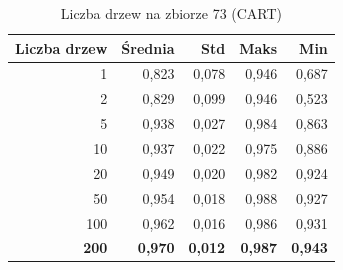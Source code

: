 \begin{table}[htbp]
\centering
\small
\setlength{\tabcolsep}{6pt}
\renewcommand{\arraystretch}{1.2}
\caption{Liczba drzew na zbiorze 73 (CART)}
\label{tab:CART_tree_count_73}
\begin{tabular}{r|r|r|r|r}
\toprule
Liczba drzew & Średnia & Std & Maks & Min \\
\hline
1 & 0,823 & 0,078 & 0,946 & 0,687 \\
2 & 0,829 & 0,099 & 0,946 & 0,523 \\
5 & 0,938 & 0,027 & 0,984 & 0,863 \\
10 & 0,937 & 0,022 & 0,975 & 0,886 \\
20 & 0,949 & 0,020 & 0,982 & 0,924 \\
50 & 0,954 & 0,018 & 0,988 & 0,927 \\
100 & 0,962 & 0,016 & 0,986 & 0,931 \\
\textbf{200} & \textbf{0,970} & \textbf{0,012} & \textbf{0,987} & \textbf{0,943} \\
\bottomrule
\end{tabular}
\end{table}